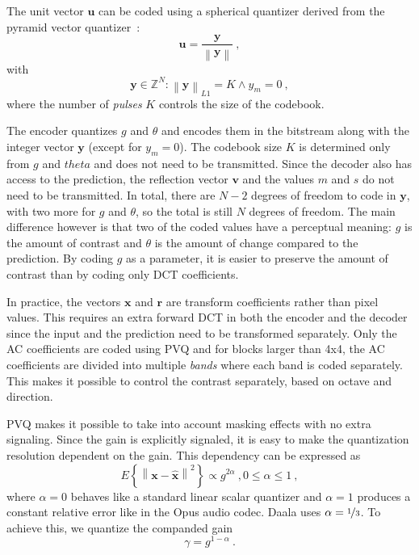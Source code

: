 \documentclass[english,conference,10pt]{IEEEtran}
\begin{document}
The unit vector $\mathbf{u}$ can be coded using a spherical quantizer derived
from the pyramid vector quantizer~\cite{Fischer1986}:
\begin{equation}
\mathbf{u}=\frac{\mathbf{y}}{\left\|\mathbf{y}\right\|}\ ,
\end{equation}
with
\begin{equation}
\mathbf{y} \in \mathbb{Z}^N : \left\|\mathbf{y}\right\|_{L1} = K \land y_m=0\ ,
\end{equation}
where the number of \textit{pulses} $K$ controls the size of the codebook.

The encoder quantizes $g$ and $\theta$ and encodes them in the bitstream along
with the integer vector $\mathbf{y}$ (except for $y_m=0$). The codebook
size $K$ is determined only from $g$ and $theta$ and does not need to be
transmitted. Since the decoder also has access to the prediction, the
reflection vector $\mathbf{v}$ and the values $m$ and $s$ do not need to
be transmitted. In total, there are $N-2$ degrees of freedom to code in
$\mathbf{y}$, with two more for $g$ and $\theta$, so the total is still
$N$ degrees of freedom. The main difference however is that two of the
coded values have a perceptual meaning: $g$ is the amount of contrast and
$\theta$ is the amount of change compared to the prediction. By coding $g$
as a parameter, it is easier to preserve the amount of contrast than by
coding only DCT coefficients.

In practice, the vectors $\mathbf{x}$ and $\mathbf{r}$ are transform
coefficients rather than pixel values. This requires an extra forward DCT
in both the encoder and the decoder since the input and the prediction need
to be transformed separately. Only the AC coefficients are coded using PVQ
and for blocks larger than 4x4, the AC coefficients are divided into multiple
\textit{bands} where each band is coded separately. This makes it possible
to control the contrast separately, based on octave and direction.

PVQ makes it possible to take into account masking effects with no
extra signaling. Since the gain is explicitly signaled, it is easy to make
the quantization resolution dependent on the gain. This dependency can be
expressed as
\begin{equation}
E\left\lbrace \left\| \mathbf{x} - \hat{\mathbf{x}} \right\|^2 \right\rbrace
\propto g^{2\alpha}\ , 0 \leq \alpha \leq 1\ ,
\end{equation}
where $\alpha=0$ behaves like a standard linear scalar quantizer and
$\alpha=1$ produces a constant relative error like in the Opus audio codec.
Daala uses $\alpha = \nicefrac{1}{3}$. To achieve this, we quantize the
companded gain
\begin{equation}
\gamma = g^{1-\alpha}\ .
\end{equation}
\end{document}
